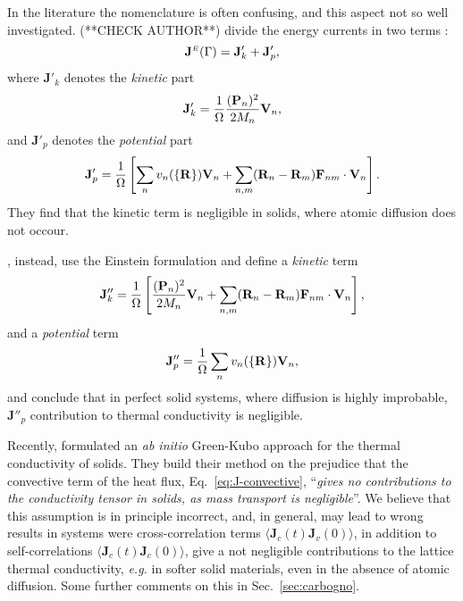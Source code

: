 \begin{LEtext}
In the literature the nomenclature is often confusing, and this aspect not so well investigated. \citet{Vogelsang1987} (**CHECK AUTHOR**) divide the energy currents in two terms \cite{McQuarrie2000}:
\begin{equation}
    \mathbf{J}^{\scriptscriptstyle E}({\mathrm\Gamma}) = \mathbf{J}'_k + \mathbf{J}'_p ,
\end{equation}
where $\mathbf{J}'_k$ denotes the \emph{kinetic} part
\begin{equation}
    \mathbf{J}'_k = \frac{1}{{\mathrm\Omega}} \frac{(\mathbf{P}_n)^2}{2M_n} \mathbf{V}_n ,
\end{equation}
and $\mathbf{J}'_p$ denotes the \emph{potential} part
\begin{equation}
    \mathbf{J}'_p = \frac{1}{{\mathrm\Omega}} \left[ \sum_n  v_n(\{\mathbf{R}\}) \mathbf{V}_n + \sum_{n,m} (\mathbf{R}_n-\mathbf{R}_m) \mathbf{F}_{n m} \cdot \mathbf{V}_n \right] .
\end{equation}
They find that the kinetic term is negligible in solids, where atomic diffusion does not occour.

\citet{Kinaci2012}, instead, use the Einstein formulation and define a \emph{kinetic} term
\begin{equation}
    \mathbf{J}''_k = \frac{1}{{\mathrm\Omega}} \left[ \frac{(\mathbf{P}_n)^2}{2M_n} \mathbf{V}_n + \sum_{n,m} (\mathbf{R}_n-\mathbf{R}_m) \mathbf{F}_{n m} \cdot \mathbf{V}_n \right],
\end{equation}
and a \emph{potential} term
\begin{equation}
    \mathbf{J}''_p = \frac{1}{{\mathrm\Omega}} \sum_n  v_n(\{\mathbf{R}\}) \mathbf{V}_n ,
\end{equation}
and conclude that in perfect solid systems, where diffusion is highly improbable, $\mathbf{J}''_p$ contribution to thermal conductivity is negligible.

Recently, \citet{Carbogno:2017gc} formulated an \emph{ab initio} Green-Kubo approach for the thermal conductivity of solids. They build their method on the prejudice that the convective term of the heat flux, Eq.~\eqref{eq:J-convective}, ``\emph{gives no contributions to the conductivity tensor in solids, as mass transport is negligible}''. We believe that this assumption is in principle incorrect, and, in general, may lead to wrong results in systems were cross-correlation terms $\langle \mathbf{J}_c(t) \mathbf{J}_v(0) \rangle$, in addition to self-correlations $\langle \mathbf{J}_c(t) \mathbf{J}_c(0) \rangle$, give a not negligible contributions to the lattice thermal conductivity, \emph{e.g.} in softer solid materials, even in the absence of atomic diffusion. Some further comments on this in Sec.~\ref{sec:carbogno}.



\end{LEtext}
